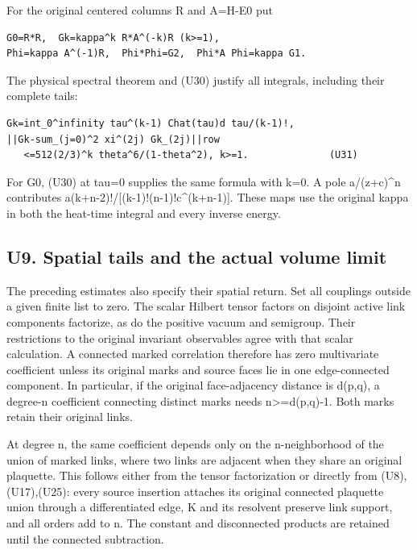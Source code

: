 \documentclass[11pt,a4paper]{article}
\renewcommand{\[}{\begingroup\small\originaldisplaystart}
\renewcommand{\]}{\originaldisplayend\endgroup}
\begin{document}
For the original centered columns R and A=H-E0 put

\begin{verbatim}
G0=R*R,  Gk=kappa^k R*A^(-k)R (k>=1),
Phi=kappa A^(-1)R,  Phi*Phi=G2,  Phi*A Phi=kappa G1.
\end{verbatim}

The physical spectral theorem and (U30) justify all integrals, including
their complete tails:

\begin{verbatim}
Gk=int_0^infinity tau^(k-1) Chat(tau)d tau/(k-1)!,
||Gk-sum_(j=0)^2 xi^(2j) Gk_(2j)||row
   <=512(2/3)^k theta^6/(1-theta^2), k>=1.              (U31)
\end{verbatim}

For G0, (U30) at tau=0 supplies the same formula with k=0. A pole
a/(z+c)\^{}n contributes
{a\allowbreak{}(\allowbreak{}k\allowbreak{}+\allowbreak{}n\allowbreak{}-\allowbreak{}2\allowbreak{})\allowbreak{}!\allowbreak{}/\allowbreak{}[\allowbreak{}(\allowbreak{}k\allowbreak{}-\allowbreak{}1\allowbreak{})\allowbreak{}!\allowbreak{}(\allowbreak{}n\allowbreak{}-\allowbreak{}1\allowbreak{})\allowbreak{}!\allowbreak{}c\allowbreak{}\textasciicircum{}\allowbreak{}(\allowbreak{}k\allowbreak{}+\allowbreak{}n\allowbreak{}-\allowbreak{}1\allowbreak{})\allowbreak{}]\allowbreak{}.\allowbreak{}}
These maps use the original kappa in both the heat-time integral and
every inverse energy.

\subsection{U9. Spatial tails and the actual volume
limit}\label{u9.-spatial-tails-and-the-actual-volume-limit}

The preceding estimates also specify their spatial return. Set all
couplings outside a given finite list to zero. The scalar Hilbert tensor
factors on disjoint active link components factorize, as do the positive
vacuum and semigroup. Their restrictions to the original invariant
observables agree with that scalar calculation. A connected marked
correlation therefore has zero multivariate coefficient unless its
original marks and source faces lie in one edge-connected component. In
particular, if the original face-adjacency distance is d(p,q), a
degree-n coefficient connecting distinct marks needs
n\textgreater=d(p,q)-1. Both marks retain their original links.

At degree n, the same coefficient depends only on the n-neighborhood of
the union of marked links, where two links are adjacent when they share
an original plaquette. This follows either from the tensor factorization
or directly from (U8),(U17),(U25): every source insertion attaches its
original connected plaquette union through a differentiated edge, K and
its resolvent preserve link support, and all orders add to n. The
constant and disconnected products are retained until the connected
subtraction.
\end{document}
